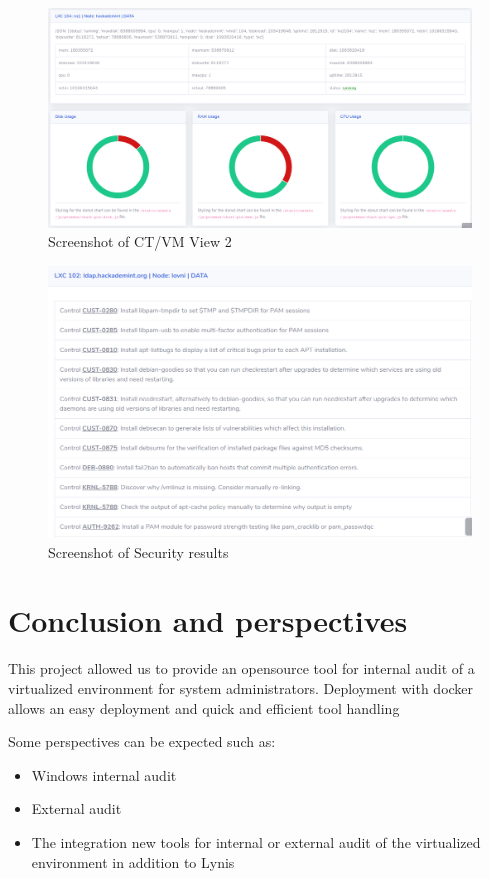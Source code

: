 \begin{figure}[!h]
  \centering
  \includegraphics[width=1.05\textwidth]{images/flask-application-3.png}
  \caption{Screenshot of CT/VM View 2}
  \label{CTView2}
\end{figure}

\pagebreak

\begin{figure}[!h]
  \centering
  \includegraphics[width=1.05\textwidth]{images/flask-application-4.png}
  \caption{Screenshot of Security results}
  \label{CTView3}
\end{figure}

\pagebreak

\section{Conclusion and perspectives}


This project allowed us to provide an opensource tool for internal audit of a virtualized environment for system administrators.
Deployment with docker allows an easy deployment and quick and efficient tool handling

Some perspectives can be expected such as:
\begin{itemize}
  \item{Windows internal audit}
  \item{External audit}
  \item{The integration new tools for internal or external audit of the virtualized environment in addition to Lynis}
\end{itemize}




